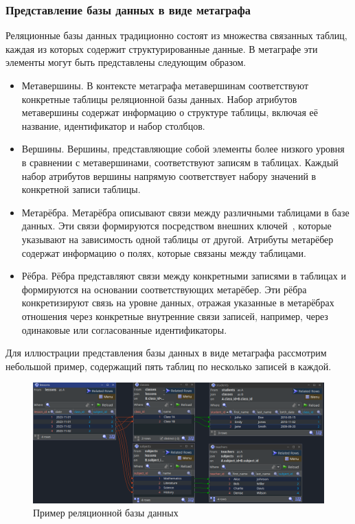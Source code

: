 \subsubsection{Представление базы данных в виде метаграфа}

Реляционные базы данных традиционно состоят из множества связанных таблиц, каждая из которых содержит структурированные данные. В метаграфе эти элементы могут быть представлены следующим образом.

\begin{itemize}
  \item Метавершины. В контексте метаграфа метавершинам соответствуют конкретные таблицы реляционной базы данных. Набор атрибутов метавершины содержат информацию о структуре таблицы, включая её название, идентификатор и набор столбцов.

  \item Вершины. Вершины, представляющие собой элементы более низкого уровня в сравнении с метавершинами, соответствуют записям в таблицах. Каждый набор атрибутов вершины напрямую соответствует набору значений в конкретной записи таблицы.

  \item Метарёбра. Метарёбра описывают связи между различными таблицами в базе данных. Эти связи формируются посредством внешних ключей~\cite{foreign-key}, которые указывают на зависимость одной таблицы от другой. Атрибуты метарёбер содержат информацию о полях, которые связаны между таблицами.

  \item Рёбра. Рёбра представляют связи между конкретными записями в таблицах и формируются на основании соответствующих метарёбер. Эти рёбра конкретизируют связь на уровне данных, отражая указанные в метарёбрах отношения через конкретные внутренние связи записей, например, через одинаковые или согласованные идентификаторы.
\end{itemize}

Для иллюстрации представления базы данных в виде метаграфа рассмотрим небольшой пример, содержащий пять таблиц по несколько записей в каждой.

\begin{figure}
  \includegraphics[scale=0.5]{./img/jailer-example-db-overview.png}
  \caption{Пример реляционной базы данных}
  \label{db-example}
\end{figure}

